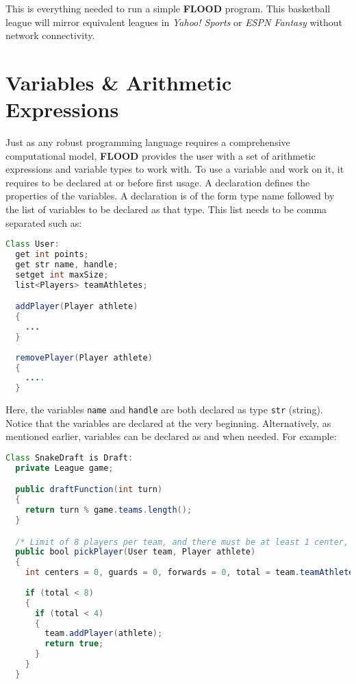 \documentclass[12pt]{report}
\begin{document}
This is everything needed to run a simple \textbf{FLOOD} program. This basketball league will mirror equivalent leagues in \textit{Yahoo! Sports} or \textit{ESPN Fantasy} without network connectivity.  

\section{Variables \& Arithmetic Expressions}

Just as any robust programming language requires a comprehensive computational model, \textbf{FLOOD} provides the user with a set of arithmetic expressions and variable types to work with. To use a variable and work on it, it requires to be declared at or before first usage. A declaration defines the properties of the variables. A declaration is of the form type name followed by the list of variables to be declared as that type. This list needs to be comma separated such as:

\begin{singlespace}
\begin{lstlisting}[language=Java,label=some-code,caption=User.fld]
Class User:
  get int points;
  get str name, handle;
  setget int maxSize;
  list<Players> teamAthletes;

  addPlayer(Player athlete)
  {
    ...
  }
  
  removePlayer(Player athlete)
  {
    ....
  }
\end{lstlisting}
\end{singlespace}

Here, the variables \texttt{name} and \texttt{handle} are both declared as type \texttt{str} (string). Notice that the variables are declared at the very beginning.  Alternatively, as mentioned earlier, variables can be declared as and when needed. For example:

\begin{singlespace}
\begin{lstlisting}[language=Java,label=some-code,caption=SnakeDraft.fld]
Class SnakeDraft is Draft:
  private League game;

  public draftFunction(int turn)
  {
    return turn % game.teams.length();
  }

  /* Limit of 8 players per team, and there must be at least 1 center, 2 guards and 2 forwards per team. */
  public bool pickPlayer(User team, Player athlete)
  {
    int centers = 0, guards = 0, forwards = 0, total = team.teamAthletes.size();
    
    if (total < 8)
    {
      if (total < 4)
      {
        team.addPlayer(athlete);
        return true;
      }
    }
  }
\end{lstlisting}
\end{singlespace}
\end{document}
